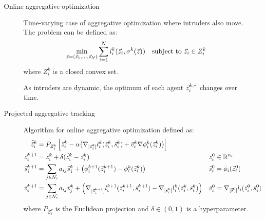 \begin{description}
    \item[Online aggregative optimization] 
        Time-varying case of aggregative optimization where intruders also move. The problem can be defined as:
        \[
            \min_{{\vec{z}}=({\vec{z}}_1, \dots, {\vec{z}}_N)} \sum_{i=1}^{N} l_i^k({\vec{z}}_i, \sigma^k({\vec{z}})) \quad\text{subject to ${\vec{z}}_i \in Z_i^k$}
        \]
        where $Z_i^k$ is a closed convex set.

        \begin{remark}
            As intruders are dynamic, the optimum of each agent ${\vec{z}}_i^{k,*}$ changes over time.
        \end{remark}

    \item[Projected aggregative tracking] 
        Algorithm for online aggregative optimization defined as:
        \[
            \begin{aligned}
                \tilde{{\vec{z}}}_i^k &= P_{Z_i^k} \left[ {\vec{z}}_i^k - \alpha \big( \nabla_{[{\vec{z}}_i^k]} l_i^k({\vec{z}}_i^k, {\vec{s}}_i^k) + {\vec{v}}_i^k \nabla\phi_i^k({\vec{z}}_i^k) \big) \right] \\
                {\vec{z}}_i^{k+1} &= {\vec{z}}_i^k + \delta(\tilde{{\vec{z}}}_i^k - {\vec{z}}_i^k) && {\vec{z}}_i^0 \in \mathbb{R}^{n_i} \\
                {\vec{s}}_i^{k+1} &= \sum_{j \in \mathcal{N}_i} a_{ij} {\vec{s}}_j^k + \left( \phi^{k+1}_i({\vec{z}}_i^{k+1}) - \phi^{k}_i({\vec{z}}_i^k) \right) && {\vec{s}}_i^0 = \phi_i({\vec{z}}_i^0) \\
                {\vec{v}}_i^{k+1} &= \sum_{j \in \mathcal{N}_i} a_{ij} {\vec{v}}_j^k + \left( \nabla_{[{\vec{s}}_i^{k+1}]} l_i^{k+1}({\vec{z}}_i^{k+1}, {\vec{s}}_i^{k+1}) - \nabla_{[{\vec{s}}_i^k]} l_i^k({\vec{z}}_i^k, {\vec{s}}_i^k) \right) && {\vec{v}}_i^0 = \nabla_{[{\vec{s}}_i^0]} l_i({\vec{z}}_i^0, {\vec{s}}_i^0) \\
            \end{aligned}
        \]
        where $P_{Z_i^k}$ is the Euclidean projection and $\delta \in (0, 1)$ is a hyperparameter.
\end{description}
